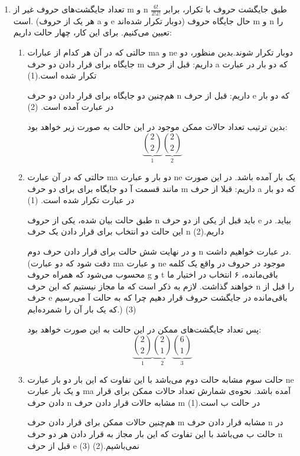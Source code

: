   \begin{enumerate}
    \item 
    \p
    تعداد جایگشت‌های حروف غیر از m و n طبق جایگشت حروف با تکرار، برابر $\frac{6!}{2!2!}$ است.
    (هر یک از حروف a و e دوبار تکرار شده‌اند)
    حال جایگاه حروف m و n را تعیین می‌کنیم.
    برای این کار، چهار حالت داریم:
    \begin{enumerate}
      \item 
      \p
      حالتی که در آن هر کدام از عبارات ma و ne
      دوبار تکرار شوند.بدین منظور، دو جایگاه برای قرار دادن دو حرف m داریم:
      قبل از حرف  a که دو بار در عبارت تکرار شده است.(1)
      
      \p
      هم‌چنین دو جایگاه برای قرار دادن دو حرف n داریم:
      قبل از حرف e که دو بار در عبارت آمده است.
      (2)
      
      \p
      بدین ترتیب تعداد حالات ممکن موجود در این حالت به صورت زیر خواهد بود:
      $$\underbrace{{2 \choose 2}}_{1}\underbrace{{2 \choose 2}}_{2}$$

      \item
      \p
      حالتی که در آن عبارت ma دو بار و عبارت ne یک بار آمده باشد. در این صورت مانند قسمت آ دو جایگاه برای 
      برای دو حرف m داریم:
      قبلا از حرف a که دو بار در عبارت تکرار شده است.
      (1)
      
      \p
      طبق حالت بیان شده، یکی از حروف n باید قبل از یکی از دو حرف e
      بیاید. در این حالت دو انتخاب برای قرار دادن یک حرف n داریم.(2)
      
      \p
      و در نهایت شش حالت برای قرار دادن حرف دوم n در عبارت خواهیم داشت.
      (دقت شود که دو عبارت ma و عبارت ne موجود در حروف
      در واقع یک کلمه محسوب می‌شود که همراه حروف  g و t باقی‌مانده، ۶ انتخاب در اختیار ما خواهند گذاشت.
      لازم به ذکر است که ما مجاز نیستیم که این حرف n را قبل از حرف e باقی‌مانده در جایگشت حروف قرار دهیم چرا که به حالت آ می‌رسیم که یک بار آن را شمرده‌ایم.)
      (3)
      
      \p
      پس تعداد جایگشت‌های ممکن در این حالت به این صورت خواهد بود:
      $$\underbrace{{2\choose 2}}_{1}\underbrace{{2 \choose 1}}_{2}\underbrace{{6\choose 1}}_{3}$$
      
      \item
      \p
      حالت سوم مشابه حالت دوم می‌باشد با این تفاوت که این بار دو بار 
      عبارت ne و یک بار عبارت ma آمده باشد.
      نحوه‌ی شمارش تعداد حالات ممکن برای قرار دادن حرف n مشابه حالات قرار دادن حرف m در حالت ب است.(1)
      
      \p
      هم‌چنین حالات ممکن برای قرار دادن حرف m مشابه قرار دادن حرف n در حالت ب می‌باشد با این تفاوت که این بار مجاز به قرار دادن هر دو حرف n قبل از حرف e نمی‌باشیم.(2) (3)
      

\end{enumerate}
\end{enumerate}
